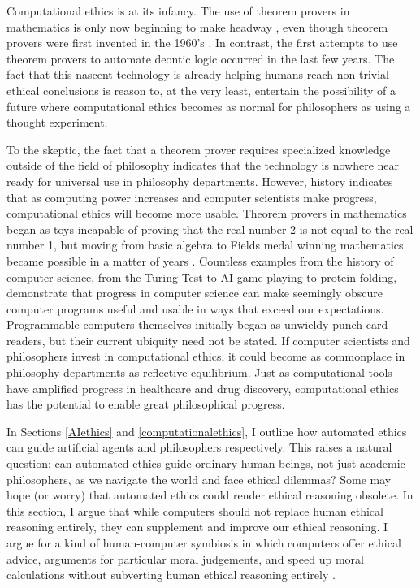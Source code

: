 \begin{isabellebody}
\begin{isamarkuptext}
Computational ethics is at its infancy. The use of theorem provers in mathematics is only now beginning 
to make headway \citep{buzzardvideo}, even though theorem provers were first invented in the 1960's \citep{historyofITP}. 
In contrast, the first attempts to use theorem provers to automate deontic logic occurred in the last
few years. The 
fact that this nascent technology is already helping humans reach non-trivial ethical conclusions 
is reason to, at the very least, entertain the possibility of a future where computational ethics 
becomes as normal for philosophers as using a thought experiment.

To the skeptic, the fact that a theorem prover requires specialized knowledge outside of the field 
of philosophy indicates that the technology is nowhere near ready for universal use in philosophy 
departments. However, history indicates that as computing power increases and computer scientists make 
progress, computational ethics will become more usable. Theorem provers in mathematics began as toys 
incapable of proving that the real number 2 is not equal to the real number 1, but 
moving from basic algebra to Fields medal winning mathematics became possible in a
matter of years \citep{buzzardvideo}. Countless examples from the history of computer science, from the Turing 
Test to AI game playing to protein folding, demonstrate that progress in computer science can make seemingly 
obscure computer programs useful and usable in ways that exceed our expectations.
Programmable computers themselves initially began as unwieldy punch card readers, but their current ubiquity 
need not be stated. If computer scientists and philosophers invest in computational ethics, it could
become as commonplace in philosophy departments as reflective equilibrium. Just as computational tools
have amplified progress in healthcare and drug discovery, computational ethics has the potential to enable
great philosophical progress.%
\end{isamarkuptext}\isamarkuptrue%
%
\isadelimdocument
%
\endisadelimdocument
%
\isatagdocument
%
\isamarkuptrue%
%
\endisatagdocument
{\isafolddocument}%
%
\isadelimdocument
%
\endisadelimdocument
%
\begin{isamarkuptext}%
In Sections \ref{AIethics} and \ref{computationalethics}, I outline how automated ethics can guide
artificial agents and philosophers respectively. This raises a natural question: can automated
ethics guide ordinary human beings, not just academic philosophers, as we navigate the world and face ethical
dilemmas? Some may hope (or worry) that automated ethics could render ethical reasoning obsolete. In 
this section, I argue that while computers should not replace human ethical reasoning entirely,
they can supplement and improve our ethical reasoning. I argue for a kind of human-computer symbiosis
in which computers offer ethical advice, arguments for particular moral judgements, and speed up moral
calculations without subverting human ethical reasoning entirely \citep{licklider}.


\end{isamarkuptext}
\end{isabellebody}
